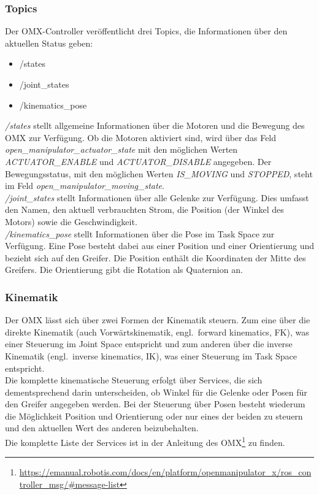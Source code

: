 \subsubsection{Topics}
Der OMX-Controller veröffentlicht drei Topics, die Informationen über den aktuellen Status geben:
\begin{itemize}
    \item /states
    \item /joint\_states
    \item /kinematics\_pose
\end{itemize}
\emph{/states} stellt allgemeine Informationen über die Motoren und die Bewegung des OMX zur Verfügung.
Ob die Motoren aktiviert sind, wird über das Feld \emph{open\_manipulator\_actuator\_state} mit den möglichen Werten \emph{ACTUATOR\_ENABLE} und \emph{ACTUATOR\_DISABLE} angegeben.
Der Bewegungsstatus, mit den möglichen Werten \emph{IS\_MOVING} und \emph{STOPPED}, steht im Feld \emph{open\_manipulator\_moving\_state}.\\
\emph{/joint\_states} stellt Informationen über alle Gelenke zur Verfügung.
Dies umfasst den Namen, den aktuell verbrauchten Strom, die Position (der Winkel des Motors) sowie die Geschwindigkeit.\\
\emph{/kinematics\_pose} stellt Informationen über die Pose im Task Space zur Verfügung.
Eine Pose besteht dabei aus einer Position und einer Orientierung und bezieht sich auf den Greifer.
Die Position enthält die Koordinaten der Mitte des Greifers.
Die Orientierung gibt die Rotation als Quaternion an.

\subsubsection{Kinematik}
Der OMX lässt sich über zwei Formen der Kinematik steuern.
Zum eine über die direkte Kinematik (auch Vorwärtskinematik, engl.\ forward kinematics, FK), was einer Steuerung im Joint Space entspricht und zum anderen über die inverse Kinematik (engl.\ inverse kinematics, IK), was einer Steuerung im Task Space entspricht.\\
Die komplette kinematische Steuerung erfolgt über Services, die sich dementsprechend darin unterscheiden, ob Winkel für die Gelenke oder Posen für den Greifer angegeben werden.
Bei der Steuerung über Posen besteht wiederum die Möglichkeit Position und Orientierung oder nur eines der beiden zu steuern und den aktuellen Wert des anderen beizubehalten.\\
Die komplette Liste der Services ist in der Anleitung des OMX\footnote{\url{https://emanual.robotis.com/docs/en/platform/openmanipulator_x/ros_controller_msg/#message-list}} zu finden.


